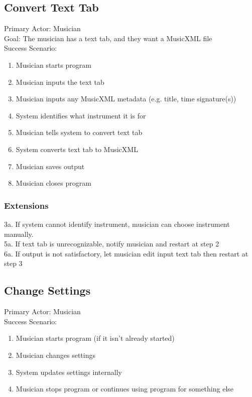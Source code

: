 \documentclass[11pt]{article}
\begin{document}
\subsection{Convert Text Tab}
\label{sec:orgab2047b}
Primary Actor: Musician \\
Goal: The musician has a text tab, and they want a MusicXML file \\
Success Scenario:
\begin{enumerate}
\item Musician starts program
\item Musician inputs the text tab
\item Musician inputs any MusicXML metadata (e.g. title, time signature(s))
\item System identifies what instrument it is for
\item Musician tells system to convert text tab
\item System converts text tab to MusicXML
\item Musician saves output
\item Musician closes program
\end{enumerate}
\subsubsection{Extensions}
\label{sec:org68ca057}
3a. If system cannot identify instrument, musician can choose instrument manually. \\
5a. If text tab is unrecognizable, notify musician and restart at step 2 \\
6a. If output is not satisfactory, let musician edit input text tab then restart at step 3
\subsection{Change Settings}
\label{sec:orge514a33}
Primary Actor: Musician \\
Success Scenario:
\begin{enumerate}
\item Musician starts program (if it isn't already started)
\item Musician changes settings
\item System updates settings internally
\item Musician stops program or continues using program for something else
\end{enumerate}
\end{document}
